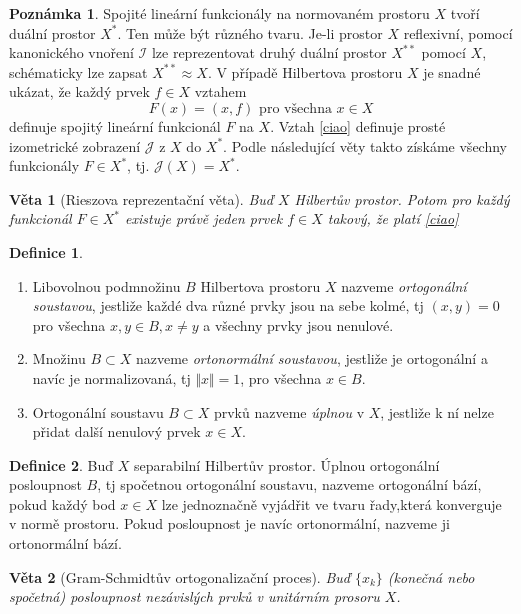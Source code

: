\documentclass[a4]{report}
\newtheorem{theorem}{Věta}
\theoremstyle{definition}
\newtheorem{definition}{Definice}[section]
\newtheorem{notes}{Poznámka}[section]
\begin{document}
{\begin{notes}
	Spojité lineární funkcionály na normovaném prostoru $X$ tvoří duální prostor $X^*$. Ten může být různého tvaru. Je-li prostor $X$ reflexivní, pomocí kanonického vnoření $\mathscr{I}$ lze reprezentovat druhý duální prostor $X^{**}$ pomocí $X$, schématicky lze zapsat $X^{**}\approx X$. V případě Hilbertova prostoru $X$ je snadné ukázat, že každý prvek $f \in X$ vztahem \begin{equation}\label{ciao}
		F(x)=(x,f) \text{       pro všechna     } x\in X
	\end{equation}
	definuje spojitý lineární funkcionál $F$ na $X$. Vztah \eqref{ciao} definuje prosté izometrické zobrazení $\mathscr{J} $ z $X$ do $X^*$. Podle následující věty takto získáme všechny funkcionály $F\in X^*$, tj. $\mathscr{J}(X)=X^*.$
\end{notes}
\begin{theorem}[Rieszova reprezentační věta]
	Buď $X$ Hilbertův prostor. Potom pro každý funkcionál $F\in X^*$ existuje právě jeden prvek $f\in X$ takový, že platí \eqref{ciao}
\end{theorem}
\begin{definition}
\begin{enumerate}
	\item Libovolnou podmnožinu $B$ Hilbertova prostoru $X$ nazveme \textit{ortogonální soustavou}, jestliže každé dva různé prvky jsou na sebe kolmé, tj $(x,y)=0$ pro všechna $x,y\in B, x\neq y$ a všechny prvky jsou nenulové.
	\item Množinu $B \subset X$ nazveme \textit{ortonormální soustavou}, jestliže je ortogonální a navíc je normalizovaná, tj $\Vert x\Vert=1$, pro všechna $x\in B$.
	\item Ortogonální soustavu $B\subset X $ prvků nazveme \textit{úplnou} v $X$, jestliže k ní nelze přidat další nenulový prvek $x\in X$.
\end{enumerate}
\end{definition}

\begin{definition}
	Buď $X$ separabilní Hilbertův prostor. Úplnou ortogonální posloupnost $B$, tj spočetnou ortogonální soustavu, nazveme ortogonální bází, pokud každý bod $x\in X$ lze jednoznačně vyjádřit ve tvaru řady,která konverguje v normě prostoru. Pokud posloupnost je navíc ortonormální, nazveme ji ortonormální bází.
\end{definition}

\begin{theorem}[Gram-Schmidtův ortogonalizační proces]
Buď $\{x_k\}$ (konečná nebo spočetná) posloupnost nezávislých prvků v unitárním prosoru $X$. 


\end{theorem}}
\end{document}
